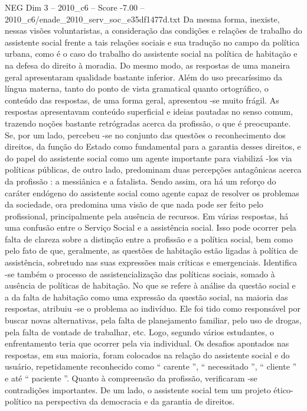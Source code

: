\begin{textsample}{NEG Dim 3 – 2010\_c6 – Score -7.00 – 2010\_c6/enade\_2010\_serv\_soc\_e35df1477d.txt}
Da mesma forma, inexiste, nessas visões voluntaristas, a consideração das condições e relações de trabalho do assistente social frente a tais relações sociais e sua tradução no campo da política urbana, como é o caso do trabalho do assistente social na política de habitação e na defesa do direito à moradia.
Do mesmo modo, as respostas de uma maneira geral apresentaram qualidade bastante inferior.
Além do uso precaríssimo da língua materna, tanto do ponto de vista gramatical quanto ortográfico, o conteúdo das respostas, de uma forma geral, apresentou -se muito frágil.
As respostas apresentavam conteúdo superficial e ideias pautadas no senso comum, trazendo noções bastante retrógradas acerca da profissão, o que é preocupante.
Se, por um lado, percebeu -se no conjunto das questões o reconhecimento dos direitos, da função do Estado como fundamental para a garantia desses direitos, e do papel do assistente social como um agente importante para viabilizá -los via políticas públicas, de outro lado, predominam duas percepções antagônicas acerca da profissão : a messiânica e a fatalista.
Sendo assim, ora há um reforço do caráter endógeno do assistente social como agente capaz de resolver os problemas da sociedade, ora predomina uma visão de que nada pode ser feito pelo profissional, principalmente pela ausência de recursos.
Em várias respostas, há uma confusão entre o Serviço Social e a assistência social.
Isso pode ocorrer pela falta de clareza sobre a distinção entre a profissão e a política social, bem como pelo fato de que, geralmente, as questões de habitação estão ligadas à política de assistência, sobretudo nas suas expressões mais críticas e emergenciais.
Identifica -se também o processo de assistencialização das políticas sociais, somado à ausência de políticas de habitação.
No que se refere à análise da questão social e a da falta de habitação como uma expressão da questão social, na maioria das respostas, atribuiu -se o problema ao indivíduo.
Ele foi tido como responsável por buscar novas alternativas, pela falta de planejamento familiar, pelo uso de drogas, pela falta de vontade de trabalhar, etc.
Logo, segundo vários estudantes, o enfrentamento teria que ocorrer pela via individual.
Os desafios apontados nas respostas, em sua maioria, foram colocados na relação do assistente social e do usuário, repetidamente reconhecido como “ carente ”, “ necessitado ”, “ cliente ” e até “ paciente ”.
Quanto à compreensão da profissão, verificaram -se contradições importantes.
De um lado, o assistente social tem um projeto ético-político na perspectiva da democracia e da garantia de direitos.

\end{textsample}
